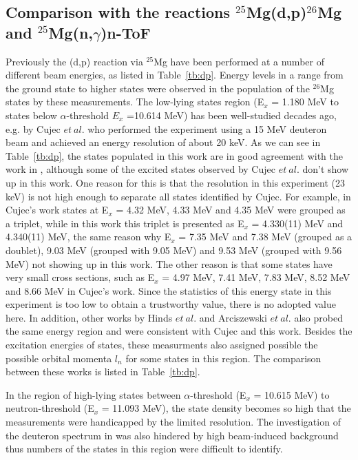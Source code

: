 \begin{center}
\begin{longtable}{cc cc c}
    \end{longtable}
\end{center}


\subsection{Comparison with the  reactions $^{25}$Mg(d,p)$^{26}$Mg and $^{25}$Mg(n,$\gamma$)n-ToF }

Previously the (d,p) reaction via $^{25}$Mg have been performed at a number of   different beam energies, as listed in Table~\ref{tb:dp}. Energy levels  in a range  from the ground state to higher states were observed in the population of  the $^{26}$Mg states by these measurements.
The low-lying states  region (E$_x$ = 1.180 MeV to states below $\alpha$-threshold $E_x$ =10.614 MeV) has been well-studied  decades ago, e.g. by Cujec $et\ al.$\citep{Cujec1964} who performed the experiment using a 15 MeV deuteron beam and achieved an energy resolution of about 20 keV. As we can see in Table~\ref{tb:dp}, the states populated in this work are in good agreement with the work in \citep{Cujec1964}, although some of the excited states observed by Cujec  $et\ al.$ don't show up in this work.
One reason for this  is that the resolution in this experiment (23 keV) is not high enough to separate all states identified by Cujec. For example, in Cujec's work states at E$_x$ = 4.32 MeV, 4.33 MeV and 4.35 MeV were grouped as a triplet, while in this work this triplet is presented as E$_x$ = 4.330(11) MeV and 4.340(11) MeV, the same reason why E$_x$ = 7.35 MeV and 7.38 MeV (grouped as a doublet), 9.03 MeV (grouped with 9.05 MeV) and 9.53 MeV (grouped with 9.56 MeV) not showing up in this work.
The other reason is that some states have very small cross sections, such as E$_x$ = 4.97 MeV, 7.41 MeV, 7.83 MeV, 8.52 MeV and 8.66 MeV in  Cujec's work. Since the statistics of this energy state in this experiment is too low to obtain a trustworthy value, there is no adopted value here.
In addition, other works  by Hinds $et\ al.$\citep{Hinds1965}\citep{Hinds1961} and Arciszewski $et\ al.$\citep{Arciszewski1984} also probed the same energy region and were consistent with Cujec and this work. Besides the excitation energies of states, these measurments also assigned possible the possible orbital momenta  $l_n$  for some states in this region.  The comparison between these works is listed in Table~\ref{tb:dp}.

In the region of high-lying  states between  $\alpha$-threshold (E$_x$ = 10.615 MeV) to neutron-threshold (E$_x$ = 11.093 MeV), the state density becomes so high that the  measurements  were handicapped by the limited resolution. The investigation of the  deuteron spectrum in  \citep{Cujec1964} was also hindered by high beam-induced background thus numbers of the states in this region were difficult to identify.

